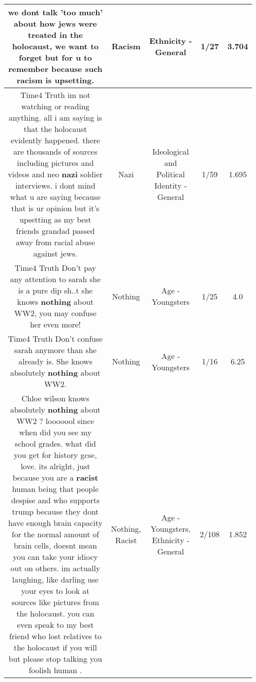 \documentclass[11pt]{article}
\newlength\mylength
\begin{document}
\begin{center}
\begin{longtable}{|C{.65\mylength}|C{.30\mylength}|C{.12\mylength}|C{.12\mylength}|C{.12\mylength}|}
  \small we dont talk 'too much' about how jews were treated in the holocaust, we want to forget but for u to remember because such \textbf{racism} is upsetting.\normalsize   & Racism & Ethnicity - General & 1/27 & 3.704 \\  \hline
  \small Time4 Truth im not watching or reading anything. all i am saying is that the holocaust evidently happened. there are thousands of sources including pictures and videos and neo \textbf{nazi} soldier interviews. i dont mind what u are saying because that is ur opinion but it's upsetting as my best friends grandad passed away from racial abuse against jews.\normalsize   & Nazi &  Ideological and Political Identity - General & 1/59 & 1.695 \\  \hline
  \small Time4 Truth  Don't pay any attention to sarah she is a pure dip sh..t  she knows \textbf{nothing} about WW2, you may confuse her even more!\normalsize   & Nothing & Age - Youngsters & 1/25 & 4.0 \\  \hline
  \small Time4 Truth  Don't confuse sarah anymore than she already is.  She knows absolutely \textbf{nothing} about WW2.\normalsize   & Nothing & Age - Youngsters & 1/16 & 6.25 \\  \hline
  \small Chloe wilson knows absolutely \textbf{nothing} about WW2 ? looooool since when did you see my school grades. what did you get for history gcse, love. its alright, just because you are a \textbf{racist} human being that people despise and who supports trump because they dont have enough brain capacity for the normal amount of brain cells, doesnt mean you can take your idiocy out on others. im actually laughing, like darling use your eyes to look at sources like pictures from the holocaust. you can even speak to my best friend who lost relatives to the holocaust if you will but please stop talking you foolish human .\normalsize   & Nothing, Racist & Age - Youngsters, Ethnicity - General & 2/108 & 1.852 \\  \hline

\end{longtable}
\end{center}
\end{document}
